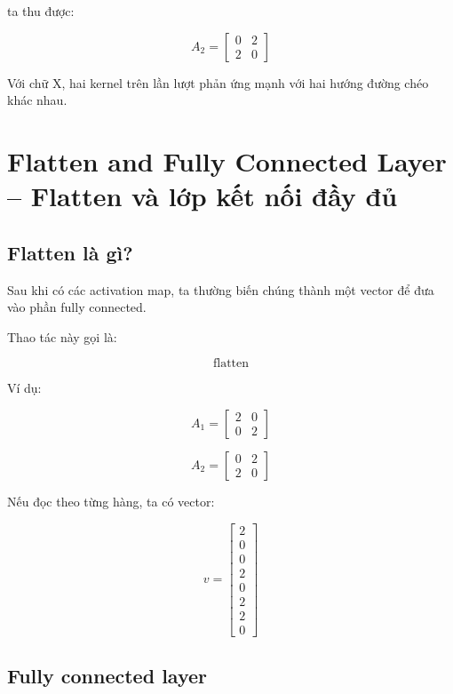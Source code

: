 ta thu được:

\[
    A_2 =
    \begin{bmatrix}
    0 & 2\\
    2 & 0
    \end{bmatrix}
\]

\begin{ghinho}
Với chữ X, hai kernel trên lần lượt phản ứng mạnh với hai hướng đường chéo khác nhau.
\end{ghinho}

\section{Flatten and Fully Connected Layer -- Flatten và lớp kết nối đầy đủ}

\subsection{Flatten là gì?}

Sau khi có các activation map, ta thường biến chúng thành một vector để đưa vào phần fully connected.

Thao tác này gọi là:

\[
    \text{flatten}
\]

Ví dụ:

\[
    A_1 =
    \begin{bmatrix}
    2 & 0\\
    0 & 2
    \end{bmatrix}
\]

\[
    A_2 =
    \begin{bmatrix}
    0 & 2\\
    2 & 0
    \end{bmatrix}
\]

Nếu đọc theo từng hàng, ta có vector:

\[
    v =
    \begin{bmatrix}
    2\\
    0\\
    0\\
    2\\
    0\\
    2\\
    2\\
    0
    \end{bmatrix}
\]

\subsection{Fully connected layer}

